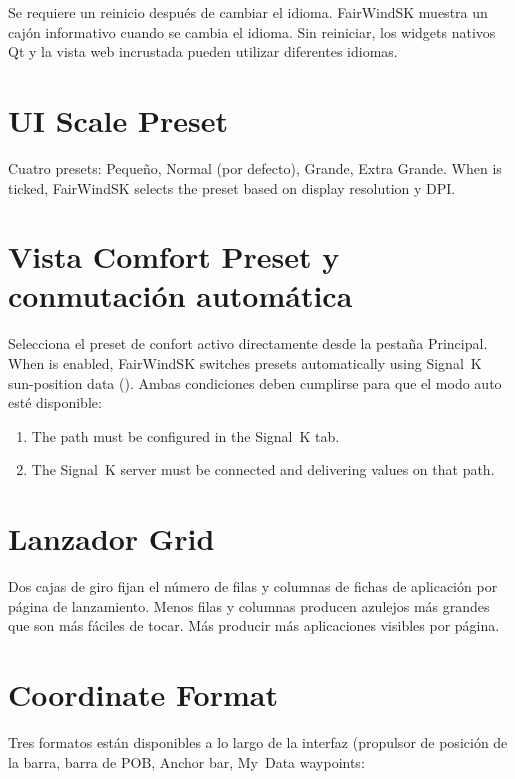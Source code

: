 \begin{warningbox}
Se requiere un reinicio después de cambiar el idioma.
FairWindSK muestra un cajón informativo cuando se cambia el idioma.
Sin reiniciar, los widgets nativos Qt y la vista web incrustada pueden utilizar diferentes
idiomas.
\end{warningbox}

\section{UI Scale Preset}

Cuatro presets: Pequeño, Normal (por defecto), Grande, Extra Grande.
When  is ticked, FairWindSK selects the preset based on display resolution
y DPI.

\section{Vista Comfort Preset y conmutación automática}

Selecciona el preset de confort activo directamente desde la pestaña Principal.
When  is enabled, FairWindSK switches presets automatically
using Signal~K sun-position data ().
Ambas condiciones deben cumplirse para que el modo auto esté disponible:

\begin{enumerate}
  \item The  path must be configured in the Signal~K tab.
  \item The Signal~K server must be connected and delivering values on that path.
\end{enumerate}

\section{Lanzador Grid}

Dos cajas de giro fijan el número de filas y columnas de fichas de aplicación por página de lanzamiento.
Menos filas y columnas producen azulejos más grandes que son más fáciles de tocar.
Más producir más aplicaciones visibles por página.

\section{Coordinate Format}

Tres formatos están disponibles a lo largo de la interfaz (propulsor de posición de la barra, barra de POB,
Anchor bar, My~Data waypoints:

